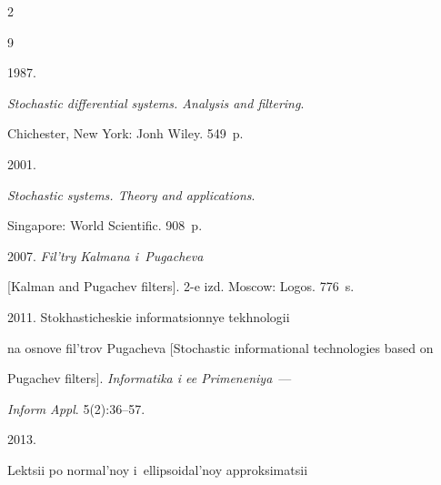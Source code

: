   \begin{multicols}{2}



\renewcommand{\bibname}{\protect\rmfamily References}








{\small\frenchspacing

 {%


 \begin{thebibliography}{9}


 1987.

\textit{Stochastic differential systems. Analysis and filtering}.

Chichester, New York: Jonh Wiley. 549~p.




 2001.

\textit{Stochastic systems. Theory and applications}.

Singapore: World Scientific.  908~p.




 2007. \textit{Fil'try Kalmana i~Pugacheva}

[Kalman and Pugachev filters]. 2-e izd. Moscow: Logos.  776~s.




 2011. Stokhasticheskie informatsionnye tekhnologii

na osnove fil'trov Pugacheva [Stochastic informational technologies based on

Pugachev filters]. \textit{Informatika i ee Primeneniya}~---

\textit{Inform Appl}.   5(2):36--57.




 2013.

Lektsii po normal'noy i~ellipsoidal'noy approksimatsii


\end{thebibliography}}}
\end{multicols}
